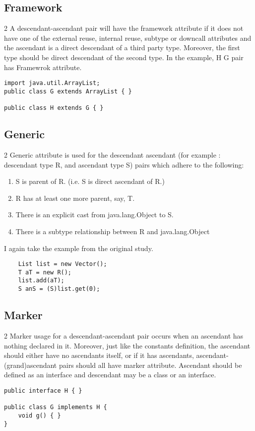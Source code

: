 \documentclass{uvamscse}
\begin{document}
\subsection{Framework}
\begin{multicols} {2}
A descendant-ascendant pair will have the framework attribute if it does not have one of the external reuse, internal reuse, subtype or downcall attributes and the ascendant is a direct descendant of a third party type. Moreover, the first type should be direct descendant of the second type. In the example, H G pair has Framewrok attribute.
\columnbreak
\begin{verbatim}
import java.util.ArrayList;
public class G extends ArrayList { }
   
public class H extends G { }
\end{verbatim}
\end{multicols}

\subsection{Generic}
\begin{multicols} {2}
Generic attribute is used for the descendant ascendant (for example : descendant type R, and ascendant type S) pairs which adhere to the following:
\begin{enumerate}
  \item S is parent of R. (i.e. S is direct ascendant of R.)
  \item R has at least one more parent, say, T.
  \item There is an explicit cast from java.lang.Object to S. 
  \item There is a subtype relationship between R and java.lang.Object
\end{enumerate}
I again take the example from the original study.
\columnbreak
\begin{verbatim}
    List list = new Vector();
    T aT = new R();
    list.add(aT);
    S anS = (S)list.get(0);
\end{verbatim}
\end{multicols}


\subsection{Marker}
\begin{multicols} {2}
Marker usage for a descendant-ascendant pair occurs when an ascendant has nothing declared in it. Moreover, just like the constants definition, the ascendant should either have no ascendants itself, or if it has ascendants, ascendant-(grand)ascendant pairs should all have marker attribute. Ascendant should be defined as an interface and descendant may be a class or an interface. 
\columnbreak
\begin{verbatim}
public interface H { }
   
public class G implements H {
    void g() { }
}
\end{verbatim}
\end{multicols}
\end{document}
